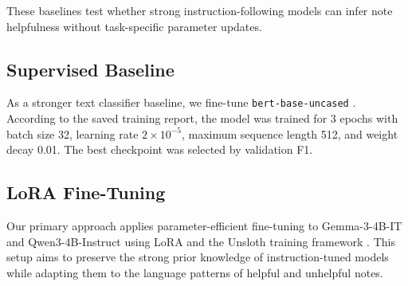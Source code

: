 \documentclass[11pt]{article}
\begin{document}
	These baselines test whether strong instruction-following models can infer note helpfulness without task-specific parameter updates.
	
	\subsection{Supervised Baseline}
	As a stronger text classifier baseline, we fine-tune \texttt{bert-base-uncased} \citep{devlin2019bert}. According to the saved training report, the model was trained for 3 epochs with batch size 32, learning rate $2\times10^{-5}$, maximum sequence length 512, and weight decay 0.01. The best checkpoint was selected by validation F1.
	
	\subsection{LoRA Fine-Tuning}
	Our primary approach applies parameter-efficient fine-tuning to Gemma-3-4B-IT and Qwen3-4B-Instruct using LoRA \citep{hu2022lora} and the Unsloth training framework \citep{unsloth2024}. This setup aims to preserve the strong prior knowledge of instruction-tuned models while adapting them to the language patterns of helpful and unhelpful notes.
	
\end{document}
